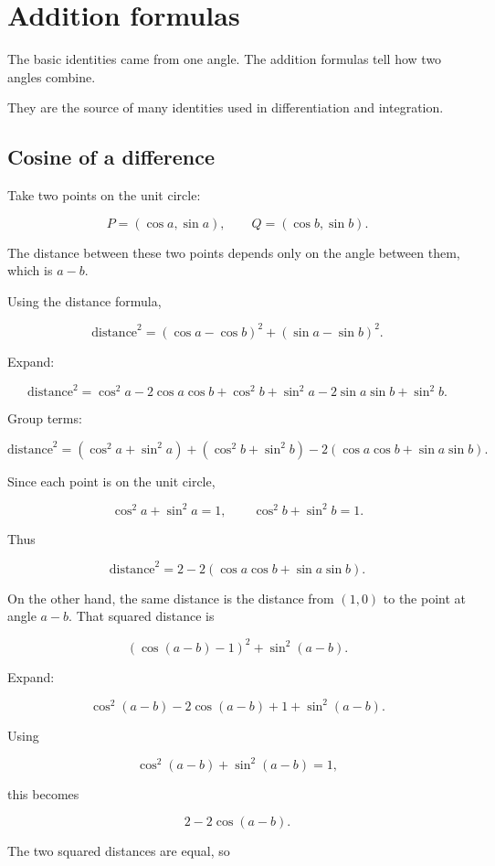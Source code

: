 \section{Addition formulas}
\label{appsec:addition-formulas}

The basic identities came from one angle.  The addition formulas tell how two angles
combine.

They are the source of many identities used in differentiation and integration.

\subsection{Cosine of a difference}
\label{appsubsec:cosine-difference}

Take two points on the unit circle:

\[
P=(\cos a,\sin a),
\qquad
Q=(\cos b,\sin b).
\]

The distance between these two points depends only on the angle between them, which is
\(a-b\).

Using the distance formula,

\[
\text{distance}^2
=
(\cos a-\cos b)^2+(\sin a-\sin b)^2.
\]

Expand:

\[
\text{distance}^2
=
\cos^2 a-2\cos a\cos b+\cos^2 b
+
\sin^2 a-2\sin a\sin b+\sin^2 b.
\]

Group terms:

\[
\text{distance}^2
=
(\cos^2 a+\sin^2 a)
+
(\cos^2 b+\sin^2 b)
-
2(\cos a\cos b+\sin a\sin b).
\]

Since each point is on the unit circle,

\[
\cos^2 a+\sin^2 a=1,
\qquad
\cos^2 b+\sin^2 b=1.
\]

Thus

\[
\text{distance}^2
=
2-2(\cos a\cos b+\sin a\sin b).
\]

On the other hand, the same distance is the distance from \((1,0)\) to the point
at angle \(a-b\).  That squared distance is

\[
(\cos(a-b)-1)^2+\sin^2(a-b).
\]

Expand:

\[
\cos^2(a-b)-2\cos(a-b)+1+\sin^2(a-b).
\]

Using

\[
\cos^2(a-b)+\sin^2(a-b)=1,
\]

this becomes

\[
2-2\cos(a-b).
\]

The two squared distances are equal, so


